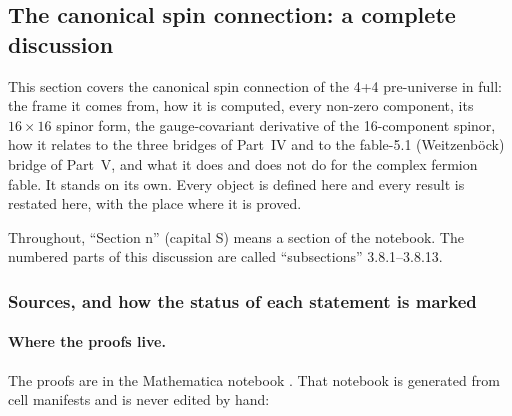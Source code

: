 \begingroup
\setlength{\emergencystretch}{4em}
\subsection{The canonical spin connection: a complete discussion}
\label{csc:top}\label{sec:3.8}

This section covers the canonical spin connection of the 4+4 pre-universe in full: the frame it
comes from, how it is computed, every non-zero component, its $16\times16$ spinor form, the
gauge-covariant derivative of the 16-component spinor, how it relates to the three bridges of
Part~IV and to the fable-5.1 (Weitzenb\"ock) bridge of Part~V, and what it does and does not do for
the complex fermion fable. It stands on its own. Every object is defined here and every result
is restated here, with the place where it is proved.

Throughout, ``Section n'' (capital S) means a section of the notebook. The numbered parts of this
discussion are called ``subsections'' 3.8.1--3.8.13.

\subsubsection{Sources, and how the status of each statement is marked}
\label{csc:sources}\label{sec:3.8.1}

\paragraph{Where the proofs live.} The proofs are in the Mathematica notebook
. That notebook is generated from cell
manifests and is never edited by hand:

